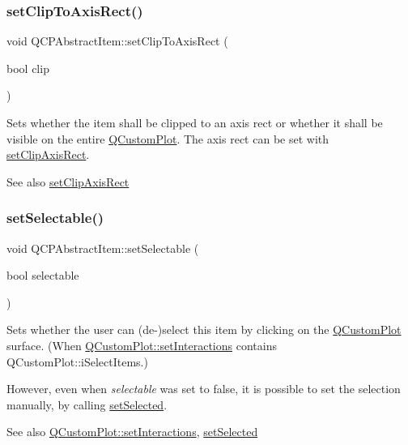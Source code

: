 \subsubsection{\texorpdfstring{setClipToAxisRect()}{setClipToAxisRect()}}
{\footnotesize\ttfamily void Q\+C\+P\+Abstract\+Item\+::set\+Clip\+To\+Axis\+Rect (\begin{DoxyParamCaption}\item[{bool}]{clip }\end{DoxyParamCaption})}

Sets whether the item shall be clipped to an axis rect or whether it shall be visible on the entire \mbox{\hyperlink{class_q_custom_plot}{Q\+Custom\+Plot}}. The axis rect can be set with \mbox{\hyperlink{class_q_c_p_abstract_item_a7dc75fcbcd10206fe0b75d757ea7a347}{set\+Clip\+Axis\+Rect}}.

\begin{DoxySeeAlso}{See also}
\mbox{\hyperlink{class_q_c_p_abstract_item_a7dc75fcbcd10206fe0b75d757ea7a347}{set\+Clip\+Axis\+Rect}} 
\end{DoxySeeAlso}
\mbox{\label{class_q_c_p_abstract_item_a8a8e32a55bc478b849756a78c2d87fd2}} 
\subsubsection{\texorpdfstring{setSelectable()}{setSelectable()}}
{\footnotesize\ttfamily void Q\+C\+P\+Abstract\+Item\+::set\+Selectable (\begin{DoxyParamCaption}\item[{bool}]{selectable }\end{DoxyParamCaption})}

Sets whether the user can (de-\/)select this item by clicking on the \mbox{\hyperlink{class_q_custom_plot}{Q\+Custom\+Plot}} surface. (When \mbox{\hyperlink{class_q_custom_plot_a5ee1e2f6ae27419deca53e75907c27e5}{Q\+Custom\+Plot\+::set\+Interactions}} contains Q\+Custom\+Plot\+::i\+Select\+Items.)

However, even when {\itshape selectable} was set to false, it is possible to set the selection manually, by calling \mbox{\hyperlink{class_q_c_p_abstract_item_a203de94ad586cc44d16c9565f49d3378}{set\+Selected}}.

\begin{DoxySeeAlso}{See also}
\mbox{\hyperlink{class_q_custom_plot_a5ee1e2f6ae27419deca53e75907c27e5}{Q\+Custom\+Plot\+::set\+Interactions}}, \mbox{\hyperlink{class_q_c_p_abstract_item_a203de94ad586cc44d16c9565f49d3378}{set\+Selected}} 
\end{DoxySeeAlso}
\mbox{\label{class_q_c_p_abstract_item_a203de94ad586cc44d16c9565f49d3378}} 
